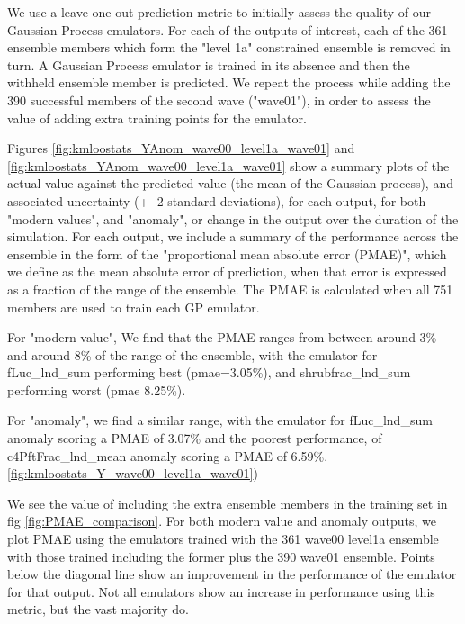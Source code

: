 \documentclass[gmd, manuscript]{copernicus}
\begin{document}
We use a leave-one-out prediction metric to initially assess the quality of our Gaussian Process emulators. For each of the outputs of interest, each of the 361 ensemble members which form the "level 1a" constrained ensemble is removed in turn. A Gaussian Process emulator is trained in its absence and then the withheld ensemble member is predicted. We repeat the process while adding the 390 successful members of the second wave ("wave01"), in order to assess the value of adding extra training points for the emulator.

Figures \ref{fig:kmloostats_YAnom_wave00_level1a_wave01} and \ref{fig:kmloostats_YAnom_wave00_level1a_wave01}  show a summary plots of the actual value against the predicted value (the mean of the Gaussian process), and associated uncertainty (+- 2 standard deviations), for each output, for both "modern values", and "anomaly", or change in the output over the duration of the simulation. For each output, we include a summary of the performance across the ensemble in the form of the "proportional mean absolute error (PMAE)", which we define as the mean absolute error of prediction, when that error is expressed as a fraction of the range of the ensemble. The PMAE is calculated when all 751 members are used to train each GP emulator.

For "modern value", We find that the PMAE ranges from between around 3\% and around 8\% of the range of the ensemble, with the emulator for fLuc\_lnd\_sum performing best (pmae=3.05\%), and shrubfrac\_lnd\_sum performing worst (pmae  8.25\%).

For "anomaly", we find a similar range, with the emulator for fLuc\_lnd\_sum anomaly scoring a PMAE of 3.07\% and the poorest performance, of c4PftFrac\_lnd\_mean anomaly scoring a PMAE of 6.59\%.  \ref{fig:kmloostats_Y_wave00_level1a_wave01}) 

We see the value of including the extra ensemble members in the training set in fig \ref{fig:PMAE_comparison}. For both modern value and anomaly outputs, we plot PMAE using the emulators trained with the 361 wave00 level1a ensemble with those trained including the former plus the 390 wave01 ensemble. Points below the diagonal line show an improvement in the performance of the emulator for that output. Not all emulators show an increase in performance using this metric, but the vast majority do.
\end{document}
